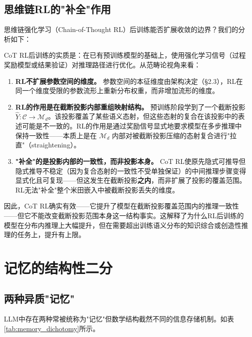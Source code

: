 \documentclass[11pt,a4paper]{ctexart}
\begin{document}
\subsection{思维链RL的"补全"作用}

思维链强化学习（Chain-of-Thought RL）后训练能否扩展收敛的边界？我们的分析如下：

CoT RL后训练的实质是：在已有预训练模型的基础上，使用强化学习信号（过程奖励模型或结果验证）对推理路径进行优化。从范畴论视角来看：

\begin{enumerate}[leftmargin=*]
    \item \textbf{RL不扩展参数空间的维度。} 参数空间的本征维度由架构决定（§2.3），RL在同一个维度受限的参数流形上重新分布权重，而非增加流形的维度。
    \item \textbf{RL的作用是在截断投影\textbf{内部}重组映射结构。} 预训练阶段学到了一个截断投影 $\hat{Y}: \mathcal{C} \to \mathcal{M}_d$。该投影覆盖了某些语义态射，但这些态射的复合在该投影中的表述可能是不一致的。RL的作用是通过奖励信号显式地要求模型在多步推理中保持一致性——本质上是在 $\mathcal{M}_d$ 内部对被截断投影压缩的态射复合进行"拉直"（straightening）。
    \item \textbf{"补全"的是投影内部的一致性，而非投影本身。} CoT RL使原先隐式可推导但隐式推导不稳定（因为复合态射的一致性不受单独保证）的中间推理步骤变得显式化且可复现——但这发生在截断投影\textbf{之内}，而非扩展了投影的覆盖范围。RL无法"补全"整个米田嵌入中被截断投影丢失的维度。
\end{enumerate}

因此，CoT RL确实有效——它提升了模型在截断投影覆盖范围内的推理一致性——但它不能改变截断投影范围本身这一结构事实。这解释了为什么RL后训练的模型在分布内推理上大幅提升，但在需要超出训练语义分布的知识综合或创造性推理的任务上，提升有上限。


\section{记忆的结构性二分}

\subsection{两种异质"记忆"}

LLM中存在两种常被统称为"记忆"但数学结构截然不同的信息存储机制。如表\ref{tab:memory_dichotomy}所示。
\end{document}
